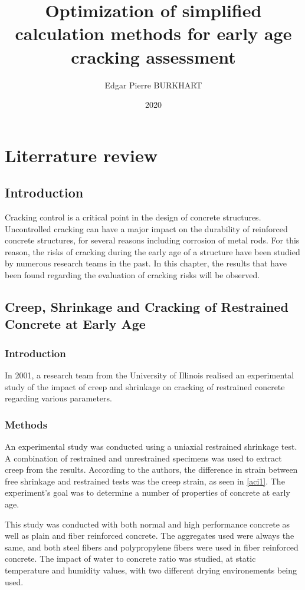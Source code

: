 \documentclass{report}
\title{Optimization of simplified calculation methods for early age cracking assessment}
\author{Edgar Pierre BURKHART}
\date{2020}
\begin{document}
\maketitle

\tableofcontents


\chapter{Literrature review}

\section{Introduction}

Cracking control is a critical point in the design of concrete structures.
Uncontrolled cracking can have a major impact on the durability of reinforced
concrete structures, for several reasons including corrosion of metal rods.
For this reason, the risks of cracking during the early age of a structure have
been studied by numerous research teams in the past. In this chapter, the
results that have been found regarding the evaluation of cracking risks will be
observed.

\section{Creep, Shrinkage and Cracking of Restrained Concrete at Early Age
\cite{cscea}}
\subsection{Introduction}
In 2001, a research team from the University of Illinois realised an
experimental study of the impact of creep and shrinkage on cracking of
restrained concrete regarding various parameters.

\subsection{Methods}
An experimental study was conducted using a uniaxial restrained shrinkage test.
A combination of restrained and unrestrained specimens was used to extract
creep from the results. According to the authors, the difference in strain
between free shrinkage and restrained tests was the creep strain, as seen in
\autoref{aci1}. The experiment's goal was to determine a number of properties
of concrete at early age.

This study was conducted with both normal and high performance concrete as
well as plain and fiber reinforced concrete. The aggregates used were always
the same, and both steel fibers and polypropylene fibers were used in fiber
reinforced concrete. The impact of water to concrete ratio was studied, at
static temperature and humidity values, with two different drying environements
being used.
\end{document}
